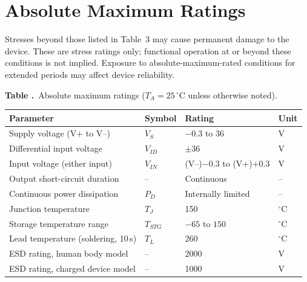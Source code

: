 \documentclass[10pt,a4paper]{article}
\newcounter{dstab}
\newcommand{\dstabcaption}[1]{%
  \par\vspace{10pt}\noindent\refstepcounter{dstab}%
  {\footnotesize\bfseries\color{accent}Table \thedstab.}~{\footnotesize #1}\par\vspace{4pt}%
}
\begin{document}
\section{Absolute Maximum Ratings}
Stresses beyond those listed in Table~3 may cause permanent damage to the
device. These are stress ratings only; functional operation at or beyond
these conditions is not implied. Exposure to absolute-maximum-rated
conditions for extended periods may affect device reliability.

\dstabcaption{Absolute maximum ratings ($T_A = 25\,^{\circ}$C unless otherwise noted).}
\begin{center}
\begin{tabular}{@{}L{6.0cm}C{1.8cm}C{3.6cm}C{1.6cm}@{}}
\toprule
{}
{\footnotesize\bfseries Parameter} & {\footnotesize\bfseries Symbol} & {\footnotesize\bfseries Rating} & {\footnotesize\bfseries Unit} \\
\midrule
Supply voltage (V+ to V--)                 & $V_S$      & $-0.3$ to $36$              & V \\
Differential input voltage                 & $V_{ID}$   & $\pm 36$                    & V \\
Input voltage (either input)                & $V_{IN}$   & (V--)$-0.3$ to (V+)$+0.3$   & V \\
Output short-circuit duration               & --         & Continuous                  & -- \\
Continuous power dissipation                & $P_D$      & Internally limited          & -- \\
Junction temperature                        & $T_J$      & 150                         & $^{\circ}$C \\
Storage temperature range                   & $T_{STG}$  & $-65$ to $150$              & $^{\circ}$C \\
Lead temperature (soldering, 10\,s)         & $T_L$      & 260                         & $^{\circ}$C \\
ESD rating, human body model                & --         & 2000                        & V \\
ESD rating, charged device model            & --         & 1000                        & V \\
\bottomrule
\end{tabular}
\end{center}
\end{document}
